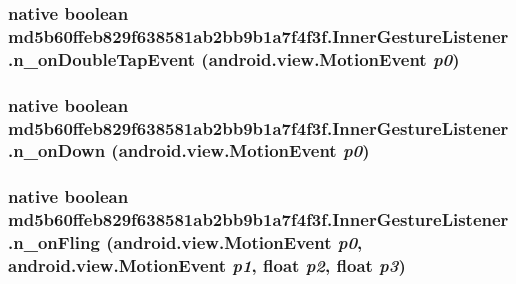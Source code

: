 \hypertarget{classmd5b60ffeb829f638581ab2bb9b1a7f4f3f_1_1_inner_gesture_listener_a21c0778bbf55b409cb91a62fa883b9e}{
\subsubsection[{n\_\-onDoubleTapEvent}]{\setlength{\rightskip}{0pt plus 5cm}native boolean md5b60ffeb829f638581ab2bb9b1a7f4f3f.InnerGestureListener.n\_\-onDoubleTapEvent (android.view.MotionEvent {\em p0})}}
\label{classmd5b60ffeb829f638581ab2bb9b1a7f4f3f_1_1_inner_gesture_listener_a21c0778bbf55b409cb91a62fa883b9e}


\hypertarget{classmd5b60ffeb829f638581ab2bb9b1a7f4f3f_1_1_inner_gesture_listener_be3cedcefc8a8fcf269a15e464191581}{
\subsubsection[{n\_\-onDown}]{\setlength{\rightskip}{0pt plus 5cm}native boolean md5b60ffeb829f638581ab2bb9b1a7f4f3f.InnerGestureListener.n\_\-onDown (android.view.MotionEvent {\em p0})}}
\label{classmd5b60ffeb829f638581ab2bb9b1a7f4f3f_1_1_inner_gesture_listener_be3cedcefc8a8fcf269a15e464191581}


\hypertarget{classmd5b60ffeb829f638581ab2bb9b1a7f4f3f_1_1_inner_gesture_listener_3eaaf5568a4411901b84c6d08f2573e4}{
\subsubsection[{n\_\-onFling}]{\setlength{\rightskip}{0pt plus 5cm}native boolean md5b60ffeb829f638581ab2bb9b1a7f4f3f.InnerGestureListener.n\_\-onFling (android.view.MotionEvent {\em p0}, \/  android.view.MotionEvent {\em p1}, \/  float {\em p2}, \/  float {\em p3})}}
\label{classmd5b60ffeb829f638581ab2bb9b1a7f4f3f_1_1_inner_gesture_listener_3eaaf5568a4411901b84c6d08f2573e4}


